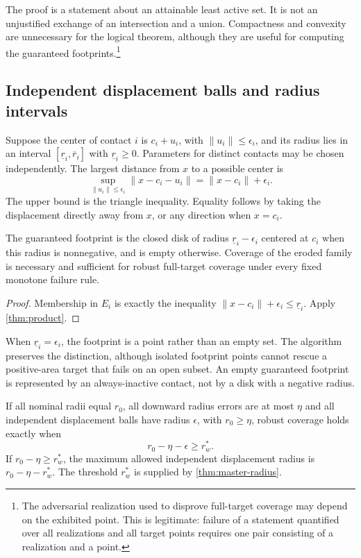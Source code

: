 The proof is a statement about an attainable least active set. It is not an unjustified exchange of an intersection and a union. Compactness and convexity are unnecessary for the logical theorem, although they are useful for computing the guaranteed footprints.\footnote{The adversarial realization used to disprove full-target coverage may depend on the exhibited point. This is legitimate: failure of a statement quantified over all realizations and all target points requires one pair consisting of a realization and a point.}

\subsection{Independent displacement balls and radius intervals}
Suppose the center of contact $i$ is $c_i+u_i$, with $\|u_i\|\le\epsilon_i$, and its radius lies in an interval $[\underline r_i,\overline r_i]$ with $\underline r_i\ge0$. Parameters for distinct contacts may be chosen independently. The largest distance from $x$ to a possible center is
\[
\sup_{\|u_i\|\le\epsilon_i}\|x-c_i-u_i\|=\|x-c_i\|+\epsilon_i.
\]
The upper bound is the triangle inequality. Equality follows by taking the displacement directly away from $x$, or any direction when $x=c_i$.

\begin{corollary}\label{cor:erosion}
The guaranteed footprint is the closed disk of radius $\underline r_i-\epsilon_i$ centered at $c_i$ when this radius is nonnegative, and is empty otherwise. Coverage of the eroded family is necessary and sufficient for robust full-target coverage under every fixed monotone failure rule.
\end{corollary}
\begin{proof}
Membership in $E_i$ is exactly the inequality $\|x-c_i\|+\epsilon_i\le\underline r_i$. Apply \cref{thm:product}.
\end{proof}

When $\underline r_i=\epsilon_i$, the footprint is a point rather than an empty set. The algorithm preserves the distinction, although isolated footprint points cannot rescue a positive-area target that fails on an open subset. An empty guaranteed footprint is represented by an always-inactive contact, not by a disk with a negative radius.

\begin{corollary}\label{cor:radius-error}
If all nominal radii equal $r_0$, all downward radius errors are at most $\eta$ and all independent displacement balls have radius $\epsilon$, with $r_0\ge\eta$, robust coverage holds exactly when
\[
r_0-\eta-\epsilon\ge r_w^*.
\]
If $r_0-\eta\ge r_w^*$, the maximum allowed independent displacement radius is $r_0-\eta-r_w^*$. The threshold $r_w^*$ is supplied by \cref{thm:master-radius}.
\end{corollary}

